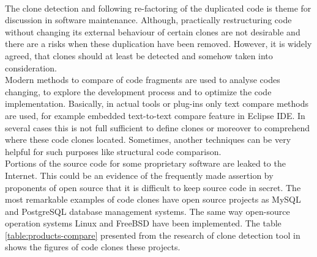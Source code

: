 \documentclass{report}
\begin{document}
\\
The clone detection and following re-factoring of the duplicated code is theme for discussion in software maintenance. Although, practically restructuring code without changing its external behaviour of certain clones are not desirable and there are a risks when these duplication have been removed. However, it is widely agreed, that clones should at least be detected and somehow taken into consideration.
\\
Modern methods to compare of code fragments are used to analyse codes changing, to explore the development process and to optimize the code implementation. Basically, in actual tools or plug-ins only text compare methods are used, for example embedded text-to-text compare feature in Eclipse IDE. In several cases this is not full sufficient to define clones or moreover to comprehend where these code clones located. Sometimes, another techniques can be very helpful for such purposes like structural code comparison.
\\ 
Portions of the source code for some proprietary software are leaked to the Internet. This could be an evidence of the frequently made assertion by proponents of open source that it is difficult to keep source code in secret. The most remarkable examples of code clones have open source projects as MySQL and PostgreSQL database management systems. The same way open-source operation systems Linux and FreeBSD have been implemented. The table \ref{table:products-compare} presented from the research of clone detection tool in \cite{CP-Miner} shows the figures of code clones these projects.
\end{document}
